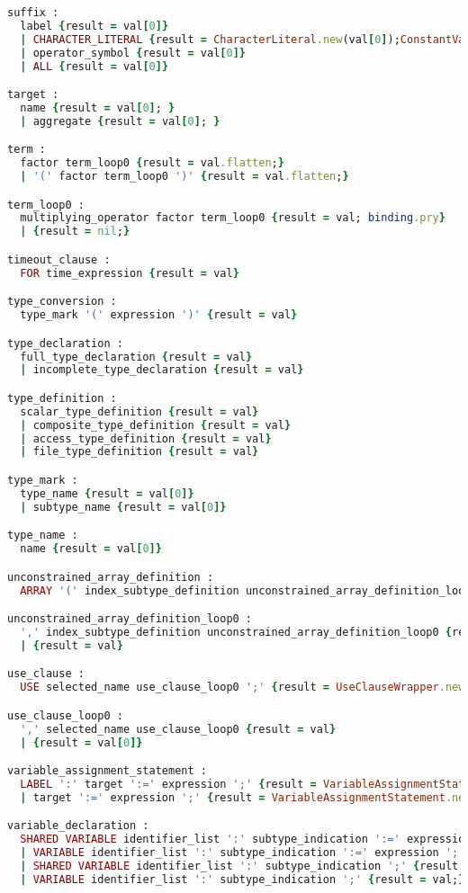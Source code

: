 \begin{lstlisting}[language=Ruby, style=rubystyle]
suffix :
  label {result = val[0]}
  | CHARACTER_LITERAL {result = CharacterLiteral.new(val[0]);ConstantValueRepository.add(result);}
  | operator_symbol {result = val[0]}
  | ALL {result = val[0]}

target :
  name {result = val[0]; }
  | aggregate {result = val[0]; }

term :
  factor term_loop0 {result = val.flatten;}
  | '(' factor term_loop0 ')' {result = val.flatten;}

term_loop0 :
  multiplying_operator factor term_loop0 {result = val; binding.pry}
  | {result = nil;}

timeout_clause :
  FOR time_expression {result = val}

type_conversion :
  type_mark '(' expression ')' {result = val}

type_declaration :
  full_type_declaration {result = val}
  | incomplete_type_declaration {result = val}

type_definition :
  scalar_type_definition {result = val}
  | composite_type_definition {result = val}
  | access_type_definition {result = val}
  | file_type_definition {result = val}

type_mark :
  type_name {result = val[0]}
  | subtype_name {result = val[0]}

type_name :
  name {result = val[0]}

unconstrained_array_definition :
  ARRAY '(' index_subtype_definition unconstrained_array_definition_loop0 ')' OF element_subtype_indication {result = val}

unconstrained_array_definition_loop0 :
  ',' index_subtype_definition unconstrained_array_definition_loop0 {result = val}
  | {result = val}

use_clause :
  USE selected_name use_clause_loop0 ';' {result = UseClauseWrapper.new(val[1,2].flatten.compact);}

use_clause_loop0 :
  ',' selected_name use_clause_loop0 {result = val}
  | {result = val[0]}

variable_assignment_statement :
  LABEL ':' target ':=' expression ';' {result = VariableAssignmentStatement.new(val[0], val[2], val[4])}
  | target ':=' expression ';' {result = VariableAssignmentStatement.new(nil, val[0], val[2])}

variable_declaration :
  SHARED VARIABLE identifier_list ':' subtype_indication ':=' expression ';' {result = val}
  | VARIABLE identifier_list ':' subtype_indication ':=' expression ';' {result = val; }
  | SHARED VARIABLE identifier_list ':' subtype_indication ';' {result = val}
  | VARIABLE identifier_list ':' subtype_indication ';' {result = val;}


\end{lstlisting}
